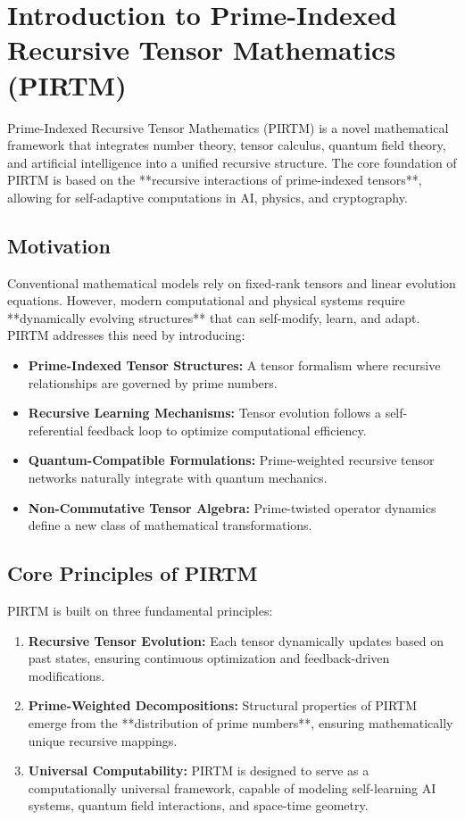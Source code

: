 \documentclass{article}
\theoremstyle{plain}
\begin{document}
\section{Introduction to Prime-Indexed Recursive Tensor Mathematics (PIRTM)}

Prime-Indexed Recursive Tensor Mathematics (PIRTM) is a novel mathematical framework that integrates number theory, tensor calculus, quantum field theory, and artificial intelligence into a unified recursive structure. The core foundation of PIRTM is based on the **recursive interactions of prime-indexed tensors**, allowing for self-adaptive computations in AI, physics, and cryptography. 

\subsection{Motivation}
Conventional mathematical models rely on fixed-rank tensors and linear evolution equations. However, modern computational and physical systems require **dynamically evolving structures** that can self-modify, learn, and adapt. PIRTM addresses this need by introducing:
\begin{itemize}
    \item \textbf{Prime-Indexed Tensor Structures:} A tensor formalism where recursive relationships are governed by prime numbers.
    \item \textbf{Recursive Learning Mechanisms:} Tensor evolution follows a self-referential feedback loop to optimize computational efficiency.
    \item \textbf{Quantum-Compatible Formulations:} Prime-weighted recursive tensor networks naturally integrate with quantum mechanics.
    \item \textbf{Non-Commutative Tensor Algebra:} Prime-twisted operator dynamics define a new class of mathematical transformations.
\end{itemize}

\subsection{Core Principles of PIRTM}
PIRTM is built on three fundamental principles:
\begin{enumerate}
    \item \textbf{Recursive Tensor Evolution:} Each tensor dynamically updates based on past states, ensuring continuous optimization and feedback-driven modifications.
    \item \textbf{Prime-Weighted Decompositions:} Structural properties of PIRTM emerge from the **distribution of prime numbers**, ensuring mathematically unique recursive mappings.
    \item \textbf{Universal Computability:} PIRTM is designed to serve as a computationally universal framework, capable of modeling self-learning AI systems, quantum field interactions, and space-time geometry.
\end{enumerate}
\end{document}
